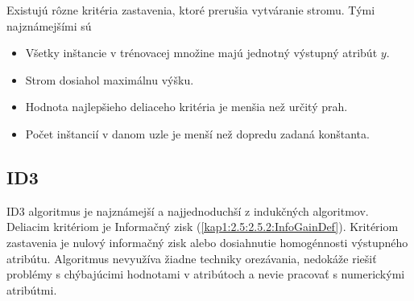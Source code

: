 %

Existujú rôzne kritéria zastavenia, ktoré prerušia vytváranie stromu. Tými najznámejšími sú

\begin{itemize}
\item Všetky inštancie v trénovacej množine majú jednotný výstupný atribút $y$.
\item Strom dosiahol maximálnu výšku.
\item Hodnota najlepšieho deliaceho kritéria je menšia než určitý prah.
\item Počet inštancií v danom uzle je menší než dopredu zadaná konštanta.
\end{itemize}

\subsection{ID3}\label{kap1:2.7:2.7.3:ID3}
ID3 algoritmus je najznámejší a najjednoduchší z indukčných algoritmov. Deliacim kritériom je Informačný zisk (\ref{kap1:2.5:2.5.2:InfoGainDef}). Kritériom zastavenia je nulový informačný zisk alebo dosiahnutie homogénnosti výstupného atribútu. Algoritmus nevyužíva žiadne techniky orezávania, nedokáže riešiť problémy s chýbajúcimi hodnotami v atribútoch a nevie pracovať s numerickými atribútmi.

